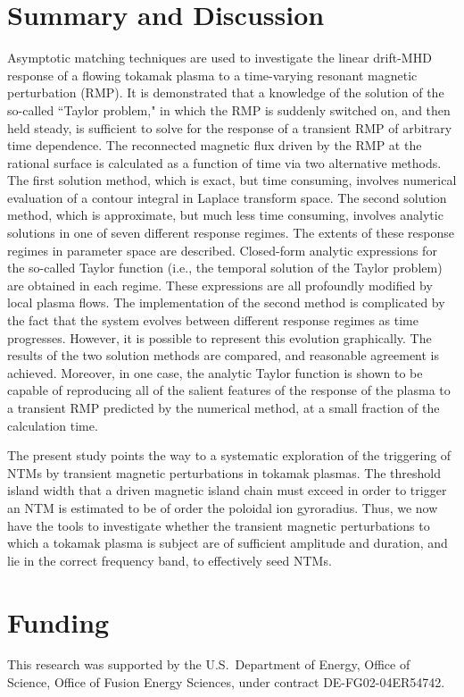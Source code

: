 \documentclass[12pt,prb,aps]{revtex4-1}
\begin{document}
\section{Summary and Discussion}
Asymptotic matching techniques are used to investigate the linear drift-MHD response of a flowing tokamak plasma to a time-varying resonant magnetic perturbation (RMP). 
It is demonstrated that a knowledge of the solution of the so-called ``Taylor problem," in which the RMP is suddenly switched on, and then held steady, is
sufficient to solve for the response of a transient RMP of arbitrary time dependence. 
The reconnected magnetic flux driven by the RMP  at the rational surface is  calculated as a function of time via  two alternative  methods.
The first solution  method, which is exact, but time consuming,  involves numerical 
evaluation of a contour integral in Laplace transform space. The second solution method, which is approximate, but much less time consuming, involves
analytic solutions in one of seven different response regimes. The extents of these response regimes in parameter space are described. 
Closed-form analytic expressions for the so-called Taylor function (i.e., the temporal solution of the Taylor problem) are obtained in each regime.
These expressions are all profoundly modified by local plasma flows.
The implementation of the second method is complicated by the fact that the system
evolves between different response regimes as time progresses. However, it is possible to represent this evolution graphically. 
 The results of the two solution methods are compared, and reasonable agreement is achieved. Moreover, in one case, the analytic Taylor function is 
 shown to be capable of reproducing all of the salient features of the response of the plasma to a transient RMP predicted by the numerical method,  at a small fraction of the calculation time. 
 
 The present study points the way to a systematic exploration of the triggering of NTMs by transient magnetic perturbations in tokamak plasmas.
 The threshold island width that a driven magnetic island chain must exceed in order to trigger an NTM is estimated to be of order the
 poloidal ion gyroradius.\cite{ntm1} Thus, we now have the tools to investigate whether the transient magnetic perturbations to which a tokamak plasma is subject are
 of sufficient amplitude and duration, and lie in the correct frequency band, to effectively seed NTMs. 

\section*{Funding}
This research was supported by the U.S.\ Department of Energy, Office of Science, Office of Fusion Energy Sciences, under  contract DE-FG02-04ER54742. 
\end{document}
